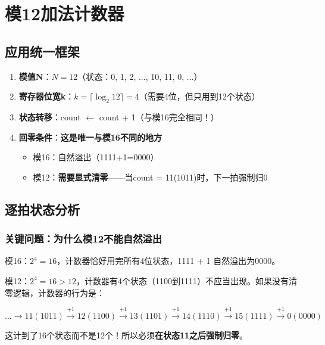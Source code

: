 \chapter{模12加法计数器}

\section{应用统一框架}

\begin{enumerate}
  \item \textbf{模值N}：$N = 12$（状态：0, 1, 2, ..., 10, 11, 0, ...）
  \item \textbf{寄存器位宽k}：$k = \lceil \log_2 12 \rceil = 4$（需要4位，但只用到12个状态）
  \item \textbf{状态转移}：count $\leftarrow$ count + 1（与模16完全相同！）
  \item \textbf{回零条件}：\textbf{这是唯一与模16不同的地方}
    \begin{itemize}
      \item 模16：自然溢出（1111+1=0000）
      \item 模12：\textbf{需要显式清零}——当count = 11(1011)时，下一拍强制归0
    \end{itemize}
\end{enumerate}

\section{逐拍状态分析}

\subsection{关键问题：为什么模12不能自然溢出}

模16：$2^4 = 16$，计数器恰好用完所有4位状态，1111 + 1 自然溢出为0000。

模12：$2^4 = 16 > 12$，计数器有4个状态（1100到1111）不应当出现。如果没有清零逻辑，计数器的行为是：

$$\text{...} \xrightarrow{} 11(1011) \xrightarrow{+1} 12(1100) \xrightarrow{+1} 13(1101) \xrightarrow{+1} 14(1110) \xrightarrow{+1} 15(1111) \xrightarrow{+1} 0(0000)$$

这计到了16个状态而不是12个！所以必须\textbf{在状态11之后强制归零}。

